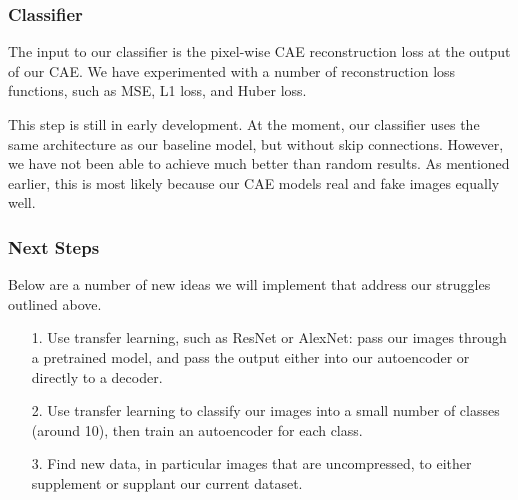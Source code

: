 \documentclass{article} %
\begin{document}
\subsubsection{Classifier}

The input to our classifier is the pixel-wise CAE reconstruction loss at the output of our CAE. We have experimented with a number of reconstruction loss functions, such as MSE, L1 loss, and Huber loss.

This step is still in early development. At the moment, our classifier uses the same architecture as our baseline model, but without skip connections. However, we have not been able to achieve much better than random results. As mentioned earlier, this is most likely because our CAE models real and fake images equally well.

\subsubsection{Next Steps}
\label{next_steps}

Below are a number of new ideas we will implement that address our struggles outlined above.

\begin{itemize}
    \item[1.] Use transfer learning, such as ResNet or AlexNet: pass our images through a pretrained model, and pass the output either into our autoencoder or directly to a decoder.
    \item[2.] Use transfer learning to classify our images into a small number of classes (around 10), then train an autoencoder for each class. 
    \item[3.] Find new data, in particular images that are uncompressed, to either supplement or supplant our current dataset.
\end{itemize}

\label{last_page}



\end{document}
